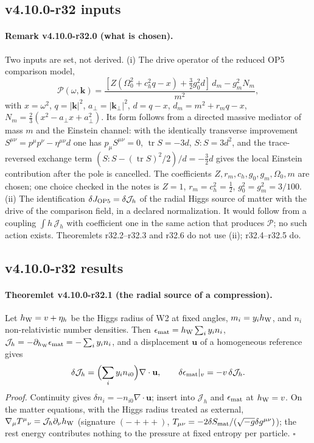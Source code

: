 \subsection*{v4.10.0-r32 inputs}
\label{subsec:v4100-r32-inputs}

\paragraph{Remark v4.10.0-r32.0 (what is chosen).}
Two inputs are set, not derived.
(i) The drive operator of the reduced OP5 comparison model,
\[
 \mathcal P(\omega,\mathbf k)=\frac{[Z(\Omega_0^2+c_h^2q-x)+\tfrac32g_0^2d]\,d_m-g_m^2N_m}{m^2},
\]
with \(x=\omega^2\), \(q=|\mathbf k|^2\), \(a_\perp=|\mathbf k_\perp|^2\), \(d=q-x\), \(d_m=m^2+r_mq-x\), \(N_m=\tfrac23(x^2-a_\perp x+a_\perp^2)\).  Its form follows from
a directed massive mediator of mass \(m\) and the Einstein channel: with the identically transverse improvement
\(S^{\mu\nu}=p^\mu p^\nu-\eta^{\mu\nu}d\) one has \(p_\mu S^{\mu\nu}=0\), \(\operatorname{tr}S=-3d\), \(S\!:\!S=3d^2\), and the trace-reversed exchange term
\((S\!:\!S-(\operatorname{tr}S)^2/2)/d=-\tfrac32d\) gives the local Einstein contribution after the pole is cancelled.  The coefficients
\(Z,r_m,c_h,g_0,g_m,\Omega_0,m\) are chosen; one choice checked in the notes is \(Z=1\), \(r_m=c_h^2=\tfrac12\), \(g_0^2=g_m^2=3/100\).
(ii) The identification \(\delta J_{\rm OP5}=\delta\mathcal J_h\) of the radial Higgs source of matter with the drive of the comparison field, in a
declared normalization.  It would follow from a coupling \(\int h\,\mathcal J_h\) with coefficient one in the same action that produces
\(\mathcal P\); no such action exists.  Theoremlets r32.2--r32.3 and r32.6 do not use (ii); r32.4--r32.5 do.

\subsection*{v4.10.0-r32 results}
\label{subsec:v4100-r32-results}

\paragraph{Theoremlet v4.10.0-r32.1 (the radial source of a compression).}
Let \(h_{\rm W}=v+\eta_h\) be the Higgs radius of W2 at fixed angles, \(m_i=y_ih_{\rm W}\), and \(n_i\) non-relativistic number densities.  Then
\(\epsilon_{\rm mat}=h_{\rm W}\sum_iy_in_i\), \(\mathcal J_h=-\partial_{h_{\rm W}}\epsilon_{\rm mat}=-\sum_iy_in_i\), and a displacement \(\mathbf u\) of a homogeneous
reference gives
\[
 \delta\mathcal J_h=\Bigl(\sum_iy_in_{i0}\Bigr)\nabla\cdot\mathbf u,\qquad \delta\epsilon_{\rm mat}|_v=-v\,\delta\mathcal J_h .
\]
\emph{Proof.} Continuity gives \(\delta n_i=-n_{i0}\nabla\cdot\mathbf u\); insert into \(\mathcal J_h\) and \(\epsilon_{\rm mat}\) at \(h_{\rm W}=v\).  On the matter equations,
with the Higgs radius treated as external, \(\nabla_\mu T^\mu{}_\nu=\mathcal J_h\partial_\nu h_{\rm W}\) (signature \((-+++)\),
\(T_{\mu\nu}=-2\delta S_{\rm mat}/(\sqrt{-g}\delta g^{\mu\nu})\)); the rest energy contributes nothing to the pressure at fixed entropy per particle.
\(\square\)

